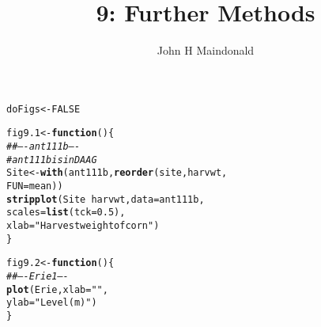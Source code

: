 \documentclass[12pt, a4paper,  BCOR=8.25mm, DIV=15]{scrartcl}\usepackage[]{graphicx}\usepackage[]{color}
\makeatletter
\newcommand{\hlnum}[1]{\textcolor[rgb]{0.686,0.059,0.569}{#1}}%
\newcommand{\hlstr}[1]{\textcolor[rgb]{0.192,0.494,0.8}{#1}}%
\newcommand{\hlcom}[1]{\textcolor[rgb]{0.678,0.584,0.686}{\textit{#1}}}%
\newcommand{\hlopt}[1]{\textcolor[rgb]{0,0,0}{#1}}%
\newcommand{\hlstd}[1]{\textcolor[rgb]{0.345,0.345,0.345}{#1}}%
\newcommand{\hlkwa}[1]{\textcolor[rgb]{0.161,0.373,0.58}{\textbf{#1}}}%
\newcommand{\hlkwb}[1]{\textcolor[rgb]{0.69,0.353,0.396}{#1}}%
\newcommand{\hlkwc}[1]{\textcolor[rgb]{0.333,0.667,0.333}{#1}}%
\newcommand{\hlkwd}[1]{\textcolor[rgb]{0.737,0.353,0.396}{\textbf{#1}}}%
\newenvironment{kframe}{%
 \def\at@end@of@kframe{}%
 \ifinner\ifhmode%
  \def\at@end@of@kframe{\end{minipage}}%
  \begin{minipage}{\columnwidth}%
 \fi\fi%
 \def\FrameCommand##1{\hskip\@totalleftmargin \hskip-\fboxsep
 \colorbox{shadecolor}{##1}\hskip-\fboxsep
     \hskip-\linewidth \hskip-\@totalleftmargin \hskip\columnwidth}%
 \MakeFramed {\advance\hsize-\width
   \@totalleftmargin\z@ \linewidth\hsize
   \@setminipage}}%
 {\par\unskip\endMakeFramed%
 \at@end@of@kframe}
\newenvironment{knitrout}{}{} %
\makeatother
\begin{document}



\title{9: Further Methods}
\author{John H Maindonald}
\maketitle
\vspace{-0.5cm}

\begin{knitrout}
\color{fgcolor}\begin{kframe}
\begin{alltt}
\hlstd{doFigs} \hlkwb{<-} \hlnum{FALSE}
\end{alltt}
\end{kframe}
\end{knitrout}
\vspace{-0.5cm}


\begin{knitrout}
\color{fgcolor}\begin{kframe}
\begin{alltt}
\hlstd{fig9.1} \hlkwb{<-} \hlkwa{function}\hlstd{()\{}
\hlcom{## ---- ant111b ----}
\hlcom{# ant111b is in DAAG}
\hlstd{Site} \hlkwb{<-} \hlkwd{with}\hlstd{(ant111b,} \hlkwd{reorder}\hlstd{(site, harvwt,}
                              \hlkwc{FUN}\hlstd{=mean))}
\hlkwd{stripplot}\hlstd{(Site} \hlopt{~} \hlstd{harvwt,} \hlkwc{data}\hlstd{=ant111b,}
          \hlkwc{scales}\hlstd{=}\hlkwd{list}\hlstd{(}\hlkwc{tck}\hlstd{=}\hlnum{0.5}\hlstd{),}
          \hlkwc{xlab}\hlstd{=}\hlstr{"Harvest weight of corn"}\hlstd{)}
\hlstd{\}}
\end{alltt}
\end{kframe}
\end{knitrout}

\begin{knitrout}
\color{fgcolor}\begin{kframe}
\begin{alltt}
\hlstd{fig9.2} \hlkwb{<-} \hlkwa{function}\hlstd{()\{}
\hlcom{## ---- Erie1 ----}
\hlkwd{plot}\hlstd{(Erie,} \hlkwc{xlab}\hlstd{=}\hlstr{""}\hlstd{,}
     \hlkwc{ylab}\hlstd{=}\hlstr{"Level (m)"}\hlstd{)}
\hlstd{\}}
\end{alltt}
\end{kframe}
\end{knitrout}
\end{document}
